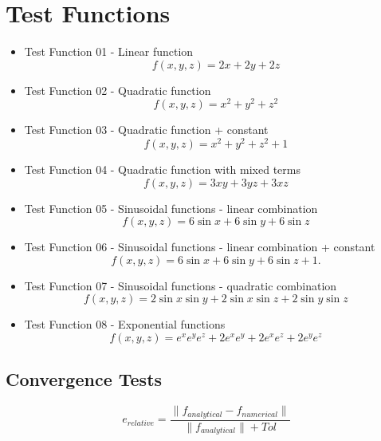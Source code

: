 \documentclass[pdftex,12pt,a4paper]{report}
\begin{document}
\chapter{Test Functions}

\begin{itemize}

   \item	Test Function 01 - Linear function
			\[ f(x,y,z) = 2x + 2y + 2z \]

   \item 	Test Function 02 - Quadratic function
			\[ f(x,y,z) = x^2 + y^2 + z^2 \]
   
   \item 	Test Function 03 - Quadratic function + constant
			\[ f(x,y,z) = x^2 + y^2 + z^2 + 1 \]

   \item 	Test Function 04 - Quadratic function with mixed terms
			\[ f(x,y,z) = 3xy + 3yz + 3xz \]
			
   \item 	Test Function 05 - Sinusoidal functions - linear combination
			\[ f(x,y,z) = 6\sin{x} + 6\sin{y} + 6\sin{z}  \]
			
   \item 	Test Function 06 - Sinusoidal functions - linear combination + constant
			\[ f(x,y,z) = 6\sin{x} + 6\sin{y} + 6\sin{z} + 1. \]

   \item 	Test Function 07 - Sinusoidal functions - quadratic combination
			\[ f(x,y,z) = 2 \sin{x} \sin{y} + 2 \sin{x} \sin{z} + 2 \sin{y} \sin{z} \]
			
   \item 	Test Function 08 - Exponential functions
			\[ f(x,y,z) = e^x e^y e^z  + 2 e^x e^y + 2 e^x e^z + 2 e^y e^z \]

  
\end{itemize}



\section{Convergence Tests}

\[ e_{relative}  = \frac{\|f_{analytical}-f_{numerical}\|}{\|f_{analytical}\|+Tol} \]

\clearpage
\end{document}
